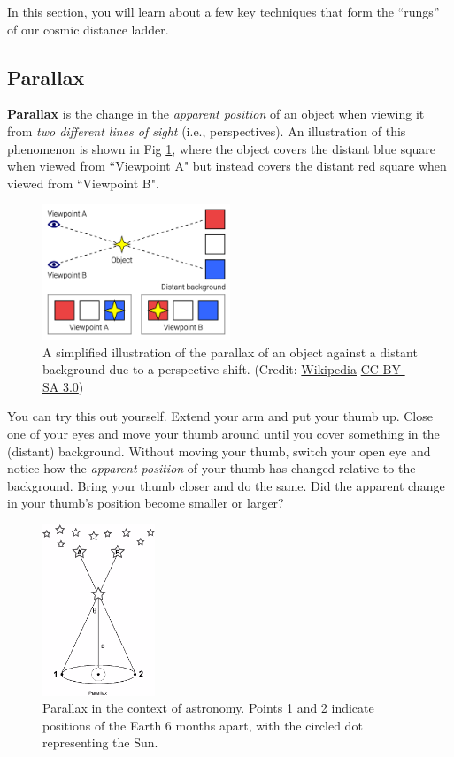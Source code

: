\documentclass[11pt]{article}
\begin{document}
In this section, you will learn about a few key techniques that form the ``rungs'' of our cosmic distance ladder.

\subsection{Parallax}

\textbf{Parallax} is the change in the \textsl{apparent position} of an object when viewing it from \textsl{two different lines of sight} (i.e., perspectives). An illustration of this phenomenon is shown in Fig \ref{fig:parallax_example}, where the object covers the distant blue square when viewed from ``Viewpoint A" but instead covers the distant red square when viewed from ``Viewpoint B".

\begin{figure}[h!]
    \centering
    \includegraphics[width=0.5\textwidth]{Parallax_Example.png}
    \caption{A simplified illustration of the parallax of an object against a distant background due to a perspective shift. (Credit: \href{https://en.wikipedia.org/wiki/Parallax\#/media/File:Parallax_Example.png}{Wikipedia} \href{https://creativecommons.org/licenses/by-sa/3.0/}{CC BY-SA 3.0})}
    \label{fig:parallax_example}
\end{figure}

You can try this out yourself. Extend your arm and put your thumb up. Close one of your eyes and move your thumb around until you cover something in the (distant) background. Without moving your thumb, switch your open eye and notice how the \textsl{apparent position} of your thumb has changed relative to the background. Bring your thumb closer and do the same. Did the apparent change in your thumb's position become smaller or larger? 

\begin{figure}[h!]
    \centering
    \includegraphics[width=0.3\textwidth]{parallax.png}
    \caption{Parallax in the context of astronomy. Points 1 and 2 indicate positions of the Earth 6 months apart, with the circled dot representing the Sun.}
    \label{fig:parallax_star}
\end{figure}
\end{document}
